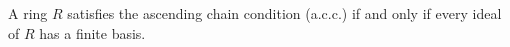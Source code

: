 A ring $R$ satisfies the ascending chain condition (a.c.c.) if and only if every ideal of $R$ has a finite basis.
